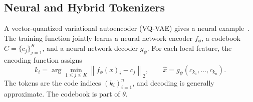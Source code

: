 \subsection{Neural and Hybrid Tokenizers}



A vector-quantized variational autoencoder (VQ-VAE) gives a neural example~\citep{oord2017vqvae}. The training function jointly learns a neural network encoder $f_{\phi}$, a codebook $C=\{c_j\}_{j=1}^{K}$, and a neural network decoder $g_{\psi}$. For each local feature, the encoding function assigns
\begin{equation}
k_i=\arg\min_{1\leq j\leq K}
\left\lVert f_{\phi}(x)_i-c_j\right\rVert_2,
\qquad
\widehat{x}=g_{\psi}(c_{k_1},\ldots,c_{k_n}).
\label{eq:vq-example}
\end{equation}
The tokens are the code indices $(k_i)_{i=1}^{n}$, and decoding is generally approximate. The codebook is part of $\theta$.



